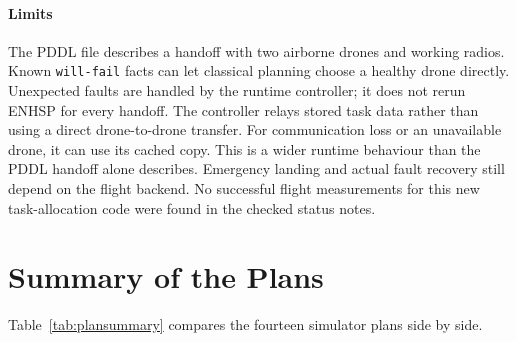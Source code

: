 \documentclass[11pt,a4paper,oneside]{report}
\newcommand{\code}[1]{\texttt{#1}}
\begin{document}
\paragraph{Limits}
The PDDL file describes a handoff with two airborne drones and working radios. Known
\code{will-fail} facts can let classical planning choose a healthy drone directly. Unexpected
faults are handled by the runtime controller; it does not rerun ENHSP for every handoff.
The controller relays stored task data rather than using a direct drone-to-drone transfer.
For communication loss or an unavailable drone, it can use its cached copy. This is a wider
runtime behaviour than the PDDL handoff alone describes. Emergency landing and actual fault
recovery still depend on the flight backend. No successful flight measurements for this new
task-allocation code were found in the checked status notes.


\section{Summary of the Plans}
Table~\ref{tab:plansummary} compares the fourteen simulator plans side by side.
\end{document}
